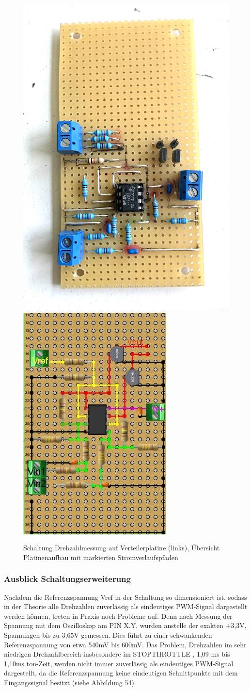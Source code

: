 \begin{figure}[H] %
\includegraphics[width=.45\textwidth]{sec4/images/Platine} 
\includegraphics[width=.40\textwidth]{sec4/images/Platinendesign}
\captionsetup{width=.95\textwidth}
\centering
\caption[Schaltungsaufbau\_mit\_Mosfet]{Schaltung Drehzahlmessung auf Verteilerplatine (links), Übersicht Platinenaufbau mit markierten Stromverlaufspfaden}\centering
\label{fig:Schaltungsaufbau}
\end{figure}


\subsubsection{Ausblick Schaltungserweiterung}\label{Sec4Sub5Sub4}
 
Nachdem die Referenzspannung Vref in der Schaltung so dimensioniert ist, sodass in der Theorie alle Drehzahlen zuverlässig als eindeutiges PWM-Signal dargestellt werden können, treten in Praxis noch Probleme auf. Denn nach Messung der Spannung mit dem Oszilloskop am PIN X.Y, wurden anstelle der exakten +3,3V, Spannungen bis zu 3,65V gemessen. Dies führt zu einer schwankenden Referenzspannung von etwa 540mV bis 600mV. Das Problem, Drehzahlen im sehr niedrigen Drehzahlbereich insbesondere im \glqq{}STOPTHROTTLE \grqq{}, 1,09 ms bis 1,10ms ton-Zeit, werden nicht immer zuverlässig als eindeutiges PWM-Signal dargestellt, da die Referenzspannung keine eindeutigen Schnittpunkte mit dem Eingangssignal besitzt (siehe Abbildung 54).\vspace{11pt}
 
